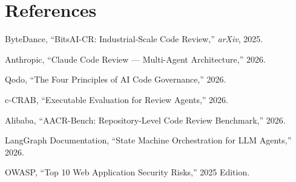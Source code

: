 \documentclass[12pt,a4paper]{article}
\begin{document}
\section{References}

\begin{enumerate}[label={[\arabic*]}]
    \item ByteDance, ``BitsAI-CR: Industrial-Scale Code Review,'' \textit{arXiv}, 2025.
    \item Anthropic, ``Claude Code Review --- Multi-Agent Architecture,'' 2026.
    \item Qodo, ``The Four Principles of AI Code Governance,'' 2026.
    \item c-CRAB, ``Executable Evaluation for Review Agents,'' 2026.
    \item Alibaba, ``AACR-Bench: Repository-Level Code Review Benchmark,'' 2026.
    \item LangGraph Documentation, ``State Machine Orchestration for LLM Agents,'' 2026.
    \item OWASP, ``Top 10 Web Application Security Risks,'' 2025 Edition.
\end{enumerate}
\end{document}

